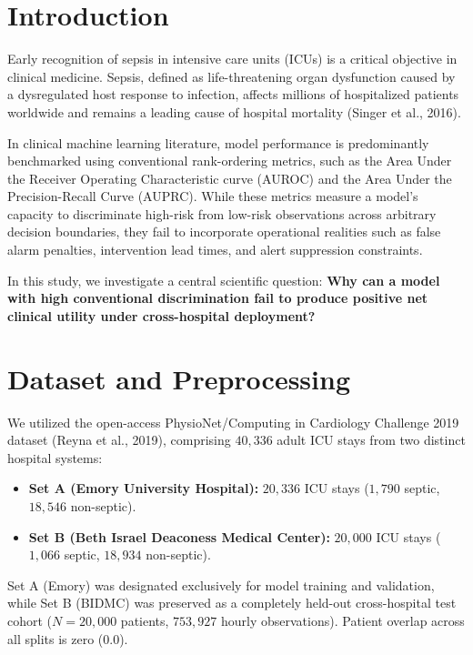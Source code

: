 \documentclass[11pt,a4paper]{article}
\begin{document}
\begin{abstract}
\textbf{Conclusion:} High conventional discrimination (AUROC $0.9617$) did not translate into positive clinical utility under cross-hospital deployment, highlighting the need for decision-theoretic evaluation frameworks in clinical artificial intelligence.
\end{abstract}

\section{Introduction}
Early recognition of sepsis in intensive care units (ICUs) is a critical objective in clinical medicine. Sepsis, defined as life-threatening organ dysfunction caused by a dysregulated host response to infection, affects millions of hospitalized patients worldwide and remains a leading cause of hospital mortality (Singer et al., 2016).

In clinical machine learning literature, model performance is predominantly benchmarked using conventional rank-ordering metrics, such as the Area Under the Receiver Operating Characteristic curve (AUROC) and the Area Under the Precision-Recall Curve (AUPRC). While these metrics measure a model's capacity to discriminate high-risk from low-risk observations across arbitrary decision boundaries, they fail to incorporate operational realities such as false alarm penalties, intervention lead times, and alert suppression constraints.

In this study, we investigate a central scientific question: \textbf{Why can a model with high conventional discrimination fail to produce positive net clinical utility under cross-hospital deployment?}

\section{Dataset and Preprocessing}
We utilized the open-access PhysioNet/Computing in Cardiology Challenge 2019 dataset (Reyna et al., 2019), comprising $40,336$ adult ICU stays from two distinct hospital systems:
\begin{itemize}
    \item \textbf{Set A (Emory University Hospital):} $20,336$ ICU stays ($1,790$ septic, $18,546$ non-septic).
    \item \textbf{Set B (Beth Israel Deaconess Medical Center):} $20,000$ ICU stays ($1,066$ septic, $18,934$ non-septic).
\end{itemize}

Set A (Emory) was designated exclusively for model training and validation, while Set B (BIDMC) was preserved as a completely held-out cross-hospital test cohort ($N=20,000$ patients, $753,927$ hourly observations). Patient overlap across all splits is zero ($0.0$).
\end{document}
